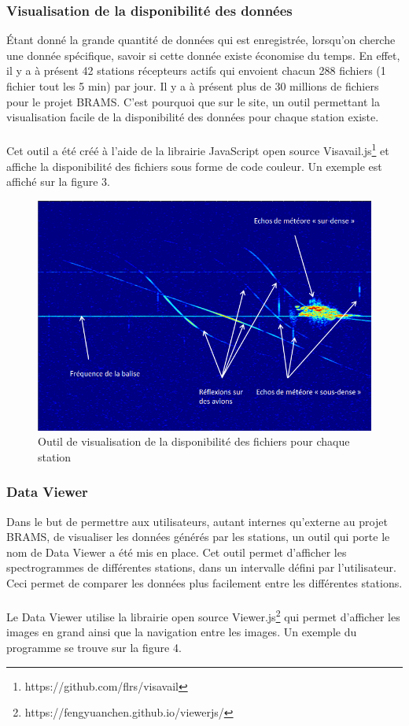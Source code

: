 \documentclass[11pt]{article}
\begin{document}
\subsubsection{Visualisation de la disponibilité des données}
Étant donné la grande quantité de données qui est enregistrée, lorsqu'on cherche une donnée spécifique, savoir si cette donnée existe économise du temps.
En effet, il y a à présent 42 stations récepteurs actifs qui envoient chacun 288 fichiers (1 fichier tout les 5 min) par jour.
Il y a à présent plus de 30 millions de fichiers pour le projet BRAMS.
C'est pourquoi que sur le site, un outil permettant la visualisation facile de la disponibilité des données pour chaque station existe.\\
\\
Cet outil a été créé à l'aide de la librairie JavaScript open source Visavail.js\footnote{https://github.com/flrs/visavail} et affiche la disponibilité des fichiers sous forme de code couleur.
Un exemple est affiché sur la figure 3.

\begin{figure}[t]
    \begin{center}
        \includegraphics[scale=0.493]{spectrogramme.png}
        \caption{Outil de visualisation de la disponibilité des fichiers pour chaque station}
    \end{center}
\end{figure}

\subsubsection{Data Viewer}
Dans le but de permettre aux utilisateurs, autant internes qu'externe au projet BRAMS, de visualiser les données générés par les stations, un outil qui porte le nom de Data Viewer a été mis en place.
Cet outil permet d'afficher les spectrogrammes de différentes stations, dans un intervalle défini par l'utilisateur.
Ceci permet de comparer les données plus facilement entre les différentes stations.\\
\\
Le Data Viewer utilise la librairie open source Viewer.js\footnote{https://fengyuanchen.github.io/viewerjs/} qui permet d'afficher les images en grand ainsi que la navigation entre les images.
Un exemple du programme se trouve sur la figure 4.
\end{document}
